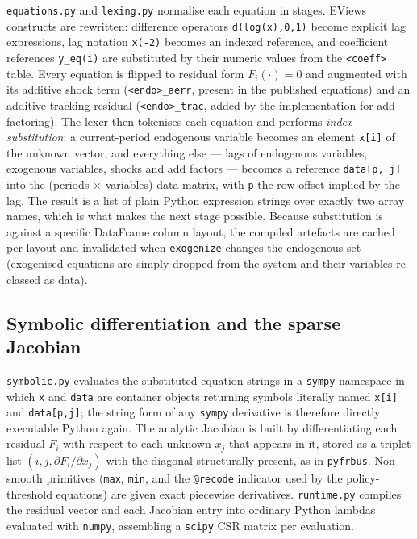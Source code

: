 \texttt{equations.py} and \texttt{lexing.py} normalise each equation in stages. EViews constructs are rewritten: difference operators \texttt{d(log(x),0,1)} become explicit lag expressions, lag notation \texttt{x(-2)} becomes an indexed reference, and coefficient references \texttt{y\_eq(i)} are substituted by their numeric values from the \texttt{<coeff>} table. Every equation is flipped to residual form $F_i(\cdot)=0$ and augmented with its additive shock term (\texttt{<endo>\_aerr}, present in the published equations) and an additive tracking residual (\texttt{<endo>\_trac}, added by the implementation for add-factoring). The lexer then tokenises each equation and performs \emph{index substitution}: a current-period endogenous variable becomes an element \texttt{x[i]} of the unknown vector, and everything else --- lags of endogenous variables, exogenous variables, shocks and add factors --- becomes a reference \texttt{data[p,\,j]} into the (periods $\times$ variables) data matrix, with \texttt{p} the row offset implied by the lag. The result is a list of plain Python expression strings over exactly two array names, which is what makes the next stage possible. Because substitution is against a specific DataFrame column layout, the compiled artefacts are cached per layout and invalidated when \texttt{exogenize} changes the endogenous set (exogenised equations are simply dropped from the system and their variables re-classed as data).

\subsection{Symbolic differentiation and the sparse Jacobian}
\label{sec:jacobian}

\texttt{symbolic.py} evaluates the substituted equation strings in a \texttt{sympy} namespace in which \texttt{x} and \texttt{data} are container objects returning symbols literally named \texttt{x[i]} and \texttt{data[p,j]}; the string form of any \texttt{sympy} derivative is therefore directly executable Python again. The analytic Jacobian is built by differentiating each residual $F_i$ with respect to each unknown $x_j$ that appears in it, stored as a triplet list $(i, j, \partial F_i/\partial x_j)$ with the diagonal structurally present, as in \texttt{pyfrbus}. Non-smooth primitives (\texttt{max}, \texttt{min}, and the \texttt{@recode} indicator used by the policy-threshold equations) are given exact piecewise derivatives. \texttt{runtime.py} compiles the residual vector and each Jacobian entry into ordinary Python lambdas evaluated with \texttt{numpy}, assembling a \texttt{scipy} CSR matrix per evaluation.

